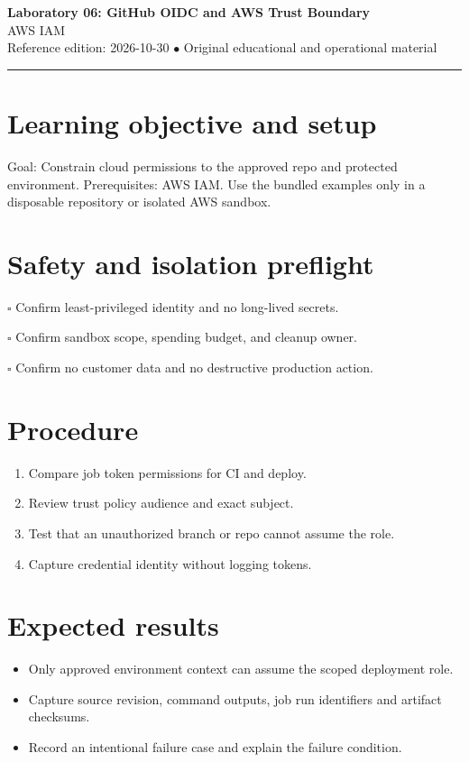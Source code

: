 \documentclass[10pt,letterpaper]{article}
\begin{document}
\begin{center}
{\LARGE\bfseries\color{cdblue}Laboratory 06: GitHub OIDC and AWS Trust Boundary}\\[7pt]
{\large AWS IAM}\\[6pt]
{\small Reference edition: 2026-10-30 $\bullet$ Original educational and operational material}
\end{center}
\noindent\color{cdblue}\rule{\linewidth}{1.2pt}\color{black}
\vspace{0.4em}
\section{Learning objective and setup}
Goal: Constrain cloud permissions to the approved repo and protected environment. Prerequisites: AWS IAM. Use the bundled examples only in a disposable repository or isolated AWS sandbox.


\section{Safety and isolation preflight}
\noindent $\square$ Confirm least-privileged identity and no long-lived secrets.\par\vspace{0.35em}
\noindent $\square$ Confirm sandbox scope, spending budget, and cleanup owner.\par\vspace{0.35em}
\noindent $\square$ Confirm no customer data and no destructive production action.\par\vspace{0.35em}

\section{Procedure}
\begin{enumerate}
\item Compare job token permissions for CI and deploy.
\item Review trust policy audience and exact subject.
\item Test that an unauthorized branch or repo cannot assume the role.
\item Capture credential identity without logging tokens.
\end{enumerate}

\section{Expected results}
\begin{itemize}
\item Only approved environment context can assume the scoped deployment role.
\item Capture source revision, command outputs, job run identifiers and artifact checksums.
\item Record an intentional failure case and explain the failure condition.
\end{itemize}
\end{document}
